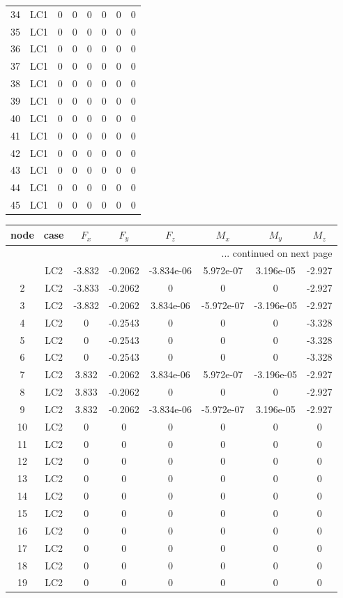 \documentclass{article}%
\begin{document}
\begin{longtable}{| c c | c c c c c c |}
34&LC1&0&0&0&0&0&0\\%
35&LC1&0&0&0&0&0&0\\%
36&LC1&0&0&0&0&0&0\\%
37&LC1&0&0&0&0&0&0\\%
38&LC1&0&0&0&0&0&0\\%
39&LC1&0&0&0&0&0&0\\%
40&LC1&0&0&0&0&0&0\\%
41&LC1&0&0&0&0&0&0\\%
42&LC1&0&0&0&0&0&0\\%
43&LC1&0&0&0&0&0&0\\%
44&LC1&0&0&0&0&0&0\\%
45&LC1&0&0&0&0&0&0\\%
\end{longtable}%
\begin{longtable}{| c c | c c c c c c |}%
\hline%
node&case&$F_x$&$F_y$&$F_z$&$M_x$&$M_y$&$M_z$\\%
\hline%
\endhead%
\hline%
\multicolumn{8}{r}{... continued on next page}\\%
\endfoot%
\hline%
\endlastfoot%
1&LC2&{-}3.832&{-}0.2062&{-}3.834e{-}06&5.972e{-}07&3.196e{-}05&{-}2.927\\%
2&LC2&{-}3.833&{-}0.2062&0&0&0&{-}2.927\\%
3&LC2&{-}3.832&{-}0.2062&3.834e{-}06&{-}5.972e{-}07&{-}3.196e{-}05&{-}2.927\\%
4&LC2&0&{-}0.2543&0&0&0&{-}3.328\\%
5&LC2&0&{-}0.2543&0&0&0&{-}3.328\\%
6&LC2&0&{-}0.2543&0&0&0&{-}3.328\\%
7&LC2&3.832&{-}0.2062&3.834e{-}06&5.972e{-}07&{-}3.196e{-}05&{-}2.927\\%
8&LC2&3.833&{-}0.2062&0&0&0&{-}2.927\\%
9&LC2&3.832&{-}0.2062&{-}3.834e{-}06&{-}5.972e{-}07&3.196e{-}05&{-}2.927\\%
10&LC2&0&0&0&0&0&0\\%
11&LC2&0&0&0&0&0&0\\%
12&LC2&0&0&0&0&0&0\\%
13&LC2&0&0&0&0&0&0\\%
14&LC2&0&0&0&0&0&0\\%
15&LC2&0&0&0&0&0&0\\%
16&LC2&0&0&0&0&0&0\\%
17&LC2&0&0&0&0&0&0\\%
18&LC2&0&0&0&0&0&0\\%
19&LC2&0&0&0&0&0&0\\%

\end{longtable}
\end{document}
